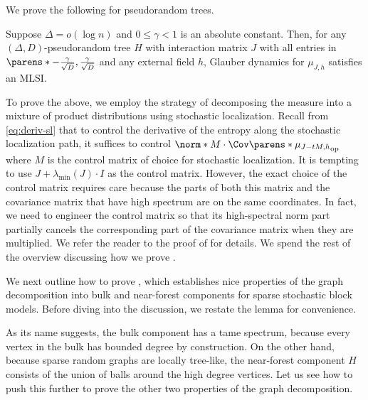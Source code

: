 \documentclass[11pt,letterpaper]{article}
\begin{document}
We prove the following for pseudorandom trees.
\begin{theorem}
    Suppose $\Delta = o(\log n)$ and $0\le \gamma < 1$ is an absolute constant.
    Then, for any $(\Delta,D)$-pseudorandom tree $H$ with interaction matrix $J$ with all entries in $\parens*{-\frac{\gamma}{\sqrt{D}}, \frac{\gamma}{\sqrt{D}}}$ and any external field $h$, Glauber dynamics for $\mu_{J,h}$ satisfies an MLSI.
\end{theorem}

To prove the above, we employ the strategy of decomposing the measure into a mixture of product distributions using stochastic localization.
Recall from \eqref{eq:deriv-sl} that to control the derivative of the entropy along the stochastic localization path, it suffices to control $\norm*{ M \cdot \Cov\parens*{\mu_{J-tM, h}}}_{\mathrm{op}}$ where $M$ is the control matrix of choice for stochastic localization.
It is tempting to use $J + \lambda_{\min}(J) \cdot I$ as the control matrix.
However, the exact choice of the control matrix requires care because the parts of both this matrix and the covariance matrix that have high spectrum  are on the same coordinates.
In fact, we need to engineer the control matrix so that its high-spectral norm part partially cancels the corresponding part of the covariance matrix when they are multiplied.
We refer the reader to the proof of  for details.
We spend the rest of the overview discussing how we prove .

We next outline how to prove , which establishes nice properties of the graph decomposition into bulk and near-forest components for sparse stochastic block models. 
Before diving into the discussion, we restate the lemma for convenience.
\graphoverview*

As its name suggests, the bulk component has a tame spectrum, because every vertex in the bulk has bounded degree by construction.
On the other hand, because sparse random graphs are locally tree-like, the near-forest component $H$ consists of the union of balls around the high degree vertices. 
Let us see how to push this further to prove the other two properties of the graph decomposition.
\end{document}

